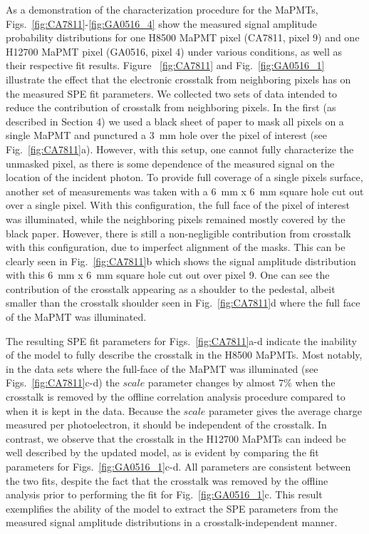 As a demonstration of the characterization procedure for the MaPMTs, Figs.~\ref{fig:CA7811}-\ref{fig:GA0516_4} show the measured signal amplitude probability distributions for one H8500 MaPMT pixel (CA7811, pixel 9) and one H12700 MaPMT pixel (GA0516, pixel 4) under various conditions, as well as their respective fit results. 
Figure ~\ref{fig:CA7811} and Fig.~\ref{fig:GA0516_1} illustrate the effect that the electronic crosstalk from neighboring pixels has on the measured SPE fit parameters. 
We collected two sets of data intended to reduce the contribution of crosstalk from neighboring pixels. In the first (as described in Section 4) we used a black sheet of paper to mask all pixels on a single MaPMT and punctured a 3~mm hole over the pixel of interest (see Fig.~\ref{fig:CA7811}a). 
However, with this setup, one cannot fully characterize the unmasked pixel, as there is some dependence of the measured signal on the location of the incident photon. 
To provide full coverage of a single pixel\textquotesingle s surface, another set of measurements was taken with a 6~mm x 6~mm square hole cut out over a single pixel. 
With this configuration, the full face of the pixel of interest was illuminated, while the neighboring pixels remained mostly covered by the black paper. 
However, there is still a non-negligible contribution from crosstalk with this configuration, due to imperfect alignment of the masks. 
This can be clearly seen in Fig.~\ref{fig:CA7811}b which shows the signal amplitude distribution with this 6~mm x 6~mm square hole cut out over pixel 9. 
One can see the contribution of the crosstalk appearing as a shoulder to the pedestal, albeit smaller than the crosstalk shoulder seen in Fig.~\ref{fig:CA7811}d where the full face of the MaPMT was illuminated. 

The resulting SPE fit parameters for Figs.~\ref{fig:CA7811}a-d indicate the inability of the model to fully describe the crosstalk in the H8500 MaPMTs. 
Most notably, in the data sets where the full-face of the MaPMT was illuminated (see Figs.~\ref{fig:CA7811}c-d) the $scale$ parameter changes by almost $7\%$ when the crosstalk is removed by the offline correlation analysis procedure compared to when it is kept in the data. 
Because the $scale$ parameter gives the average charge measured per photoelectron, it should be independent of the crosstalk. 
In contrast, we observe that the crosstalk in the H12700 MaPMTs can indeed be well described by the updated model, as is evident by comparing the fit parameters for Figs.~\ref{fig:GA0516_1}c-d. 
All parameters are consistent between the two fits, despite the fact that the crosstalk was removed by the offline analysis prior to performing the fit for Fig.~\ref{fig:GA0516_1}c. 
This result exemplifies the ability of the model to extract the SPE parameters from the measured signal amplitude distributions in a crosstalk-independent manner. 

